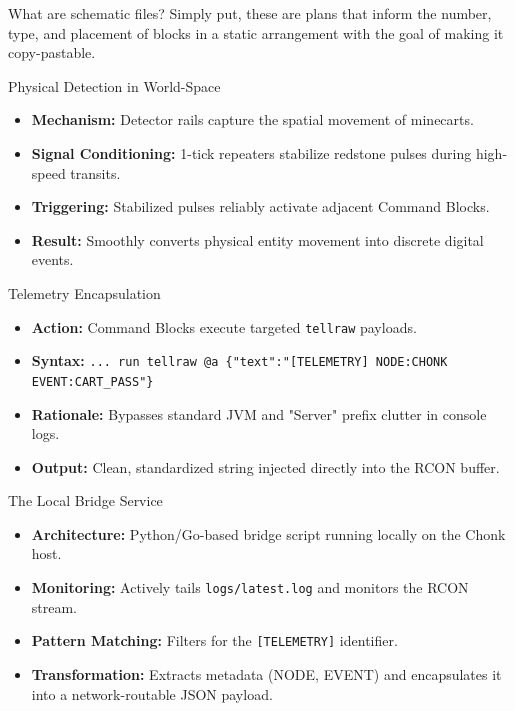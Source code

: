 \documentclass[notes]{beamer}
\begin{document}
	\begin{frame}{What are schematic files?}
		Simply put, these are plans that inform the number, type, and placement of blocks in a static arrangement with the goal of making it copy-pastable.
	\end{frame}
	
	\begin{frame}{Physical Detection in World-Space}
		\begin{itemize}
			\item \textbf{Mechanism:} Detector rails capture the spatial movement of minecarts.
			\item \textbf{Signal Conditioning:} 1-tick repeaters stabilize redstone pulses during high-speed transits.
			\item \textbf{Triggering:} Stabilized pulses reliably activate adjacent Command Blocks.
			\item \textbf{Result:} Smoothly converts physical entity movement into discrete digital events.
		\end{itemize}
	\end{frame}

	\begin{frame}{Telemetry Encapsulation}
		\begin{itemize}
			\item \textbf{Action:} Command Blocks execute targeted \texttt{tellraw} payloads.
			\item \textbf{Syntax:} \texttt{... run tellraw @a \{"text":"[TELEMETRY] NODE:CHONK EVENT:CART\_PASS"\}}
			\item \textbf{Rationale:} Bypasses standard JVM and "Server" prefix clutter in console logs.
			\item \textbf{Output:} Clean, standardized string injected directly into the RCON buffer.
		\end{itemize}
	\end{frame}
	
	\begin{frame}{The Local Bridge Service}
		\begin{itemize}
			\item \textbf{Architecture:} Python/Go-based bridge script running locally on the Chonk host.
			\item \textbf{Monitoring:} Actively tails \texttt{logs/latest.log} and monitors the RCON stream.
			\item \textbf{Pattern Matching:} Filters for the \texttt{[TELEMETRY]} identifier.
			\item \textbf{Transformation:} Extracts metadata (NODE, EVENT) and encapsulates it into a network-routable JSON payload.
		\end{itemize}
	\end{frame}
	
\end{document}
